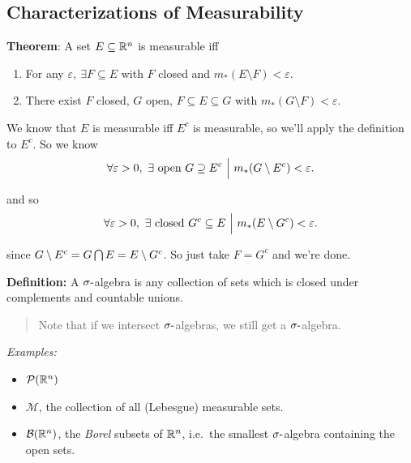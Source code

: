 \hypertarget{characterizations-of-measurability}{%
\subsection{Characterizations of
Measurability}\label{characterizations-of-measurability}}

\textbf{Theorem}: A set \(E\subseteq {\mathbb{R}}^n\) is measurable iff

\begin{enumerate}
\def\labelenumi{\arabic{enumi}.}
\tightlist
\item
  For any \(\varepsilon,~\exists F\subseteq E\) with \(F\) closed and
  \(m_*(E\setminus F) < \varepsilon\).
\item
  There exist \(F\) closed, \(G\) open, \(F \subseteq E \subseteq G\)
  with \(m_*(G\setminus F) < \varepsilon\).
\end{enumerate}

We know that \(E\) is measurable iff \(E^c\) is measurable, so we'll
apply the definition to \(E^c\). So we know
\begin{align*}
\forall \varepsilon > 0,~ \exists \text{ open } G \supseteq E^c {~\mathrel{\Big|}~} m_*(G\setminus E^c) < \varepsilon .
\end{align*}

and so
\begin{align*}
\forall \varepsilon > 0,~ \exists \text{ closed } G^c \subseteq E {~\mathrel{\Big|}~} m_*(E \setminus G^c) < \varepsilon .
\end{align*}

since \(G\setminus E^c = G \bigcap E = E \setminus G^c\). So just
take \(F = G^c\) and we're done.

\textbf{Definition:} A \(\sigma{\hbox{-}}\)algebra is any collection of sets
which is closed under complements and countable unions.

\begin{quote}
Note that if we intersect \(\sigma{\hbox{-}}\)algebras, we still get a
\(\sigma{\hbox{-}}\)algebra.
\end{quote}

\emph{Examples:}

\begin{itemize}
\item
  \(\mathcal P({\mathbb{R}}^n)\)
\item
  \(\mathcal M\), the collection of all (Lebesgue) measurable sets.
\item
  \(\mathcal B({\mathbb{R}}^n)\), the \emph{Borel} subsets of \({\mathbb{R}}^n\), i.e.~the
  smallest \(\sigma{\hbox{-}}\)algebra containing the open sets.
\end{itemize}

